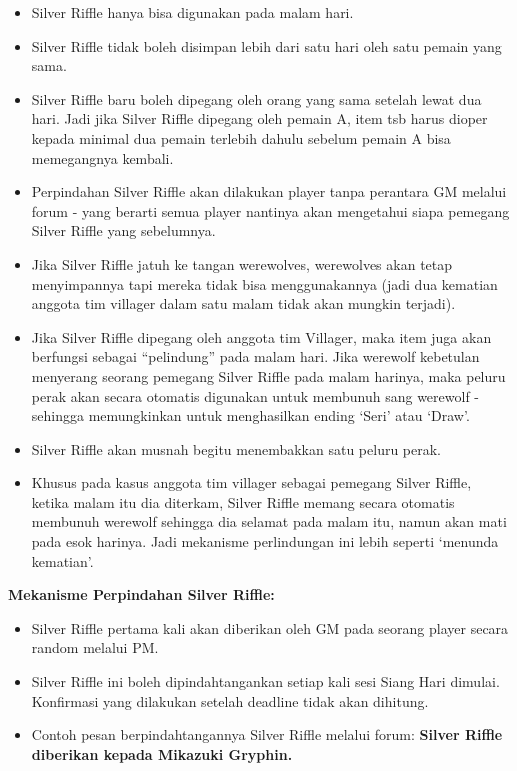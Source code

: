 \documentclass[]{book}
\begin{document}
\begin{itemize}
\item
  Silver Riffle hanya bisa digunakan pada malam hari.
\item
  Silver Riffle tidak boleh disimpan lebih dari satu hari oleh satu
  pemain yang sama.
\item
  Silver Riffle baru boleh dipegang oleh orang yang sama setelah lewat
  dua hari. Jadi jika Silver Riffle dipegang oleh pemain A, item tsb
  harus dioper kepada minimal dua pemain terlebih dahulu sebelum pemain
  A bisa memegangnya kembali.
\item
  Perpindahan Silver Riffle akan dilakukan player tanpa perantara GM
  melalui forum - yang berarti semua player nantinya akan mengetahui
  siapa pemegang Silver Riffle yang sebelumnya.
\item
  Jika Silver Riffle jatuh ke tangan werewolves, werewolves akan tetap
  menyimpannya tapi mereka tidak bisa menggunakannya (jadi dua kematian
  anggota tim villager dalam satu malam tidak akan mungkin terjadi).
\item
  Jika Silver Riffle dipegang oleh anggota tim Villager, maka item juga
  akan berfungsi sebagai ``pelindung'' pada malam hari. Jika werewolf
  kebetulan menyerang seorang pemegang Silver Riffle pada malam harinya,
  maka peluru perak akan secara otomatis digunakan untuk membunuh sang
  werewolf - sehingga memungkinkan untuk menghasilkan ending `Seri' atau
  `Draw'.
\item
  Silver Riffle akan musnah begitu menembakkan satu peluru perak.
\item
  Khusus pada kasus anggota tim villager sebagai pemegang Silver Riffle,
  ketika malam itu dia diterkam, Silver Riffle memang secara otomatis
  membunuh werewolf sehingga dia selamat pada malam itu, namun akan mati
  pada esok harinya. Jadi mekanisme perlindungan ini lebih seperti
  `menunda kematian'.
\end{itemize}

\textbf{Mekanisme Perpindahan Silver Riffle:}

\begin{itemize}
\item
  Silver Riffle pertama kali akan diberikan oleh GM pada seorang player
  secara random melalui PM.
\item
  Silver Riffle ini boleh dipindahtangankan setiap kali sesi Siang Hari
  dimulai. Konfirmasi yang dilakukan setelah deadline tidak akan
  dihitung.
\item
  Contoh pesan berpindahtangannya Silver Riffle melalui forum:
  \textbf{Silver Riffle diberikan kepada Mikazuki Gryphin.}
\end{itemize}
\end{document}
